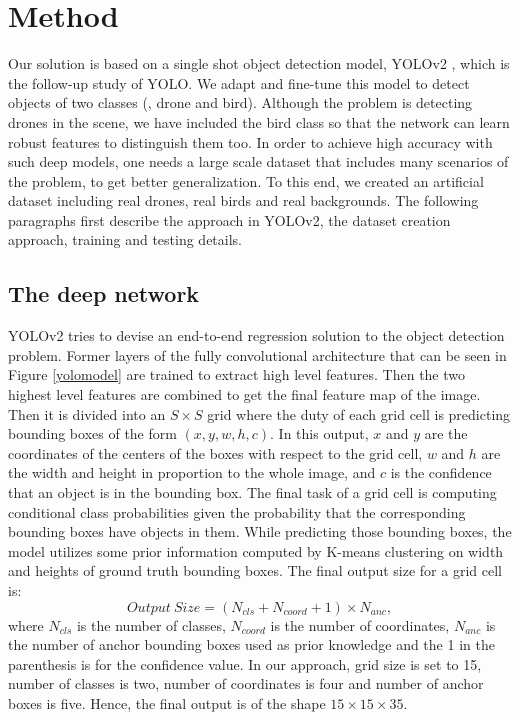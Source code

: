 \documentclass[10pt,twocolumn,letterpaper]{article}
\begin{document}
\section{Method}\label{method}
Our solution is based on a single shot object detection model, YOLOv2 \cite{DBLP:journals/corr/RedmonF16}, which is the follow-up study of YOLO. We adapt and fine-tune this model to detect objects of two classes (\ie, drone and bird). Although the problem is detecting drones in the scene, we have included the bird class so that the network can learn robust features to distinguish them too. In order to achieve high accuracy with such deep models, one needs a large scale dataset that includes many scenarios of the problem, to get better generalization. To this end, we created an artificial dataset including real drones, real birds and real backgrounds. The following paragraphs first describe the approach in YOLOv2, the dataset creation approach, training and testing details.
\par\subsection{The deep network} YOLOv2 tries to devise an end-to-end regression solution to the object detection problem. Former layers of the fully convolutional architecture that can be seen in Figure \ref{yolomodel} are trained to extract high level features. Then the two highest level features are combined to get the final feature map of the image. Then it is divided into an $S \times S$ grid where the duty of each grid cell is predicting  bounding boxes of the form $(x,y,w,h,c)$. In this output, $x$ and $y$ are the coordinates of the centers of the boxes with respect to the grid cell, $w$ and $h$ are the width and height in proportion to the whole image, and $c$ is the confidence that an object is in the bounding box. The final task of a grid cell is computing conditional class probabilities given the probability that the corresponding bounding boxes have objects in them. While predicting those bounding boxes, the model utilizes some prior information computed by K-means clustering on width and heights of ground truth bounding boxes. The final output size for a grid cell is:
\[Output\:Size = (N_{cls}+N_{coord}+1)\times N_{anc},\]
where $N_{cls}$ is the number of classes, $N_{coord}$ is the number of coordinates, $N_{anc}$ is the number of anchor bounding boxes used as prior knowledge and the 1 in the parenthesis is for the confidence value. In our approach, grid size is set to 15, number of classes is two, number of coordinates is four and number of anchor boxes is five. Hence, the final output is of the shape $15\times 15 \times 35$.
\end{document}
